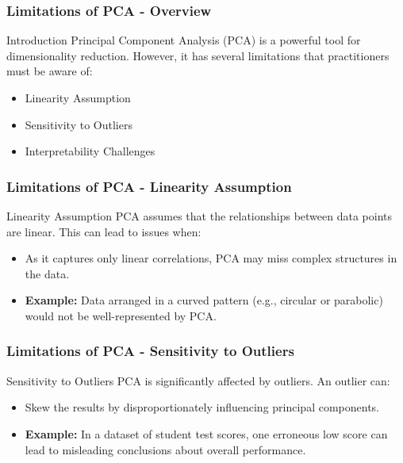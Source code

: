 \documentclass[aspectratio=169]{beamer}
\begin{document}
\begin{frame}[fragile]
    \frametitle{Limitations of PCA - Overview}
    \begin{block}{Introduction}
        Principal Component Analysis (PCA) is a powerful tool for dimensionality reduction. However, it has several limitations that practitioners must be aware of:
    \end{block}
    \begin{itemize}
        \item Linearity Assumption
        \item Sensitivity to Outliers
        \item Interpretability Challenges
    \end{itemize}
\end{frame}

\begin{frame}[fragile]
    \frametitle{Limitations of PCA - Linearity Assumption}
    \begin{block}{Linearity Assumption}
        PCA assumes that the relationships between data points are linear. This can lead to issues when:
    \end{block}
    \begin{itemize}
        \item As it captures only linear correlations, PCA may miss complex structures in the data.
        \item \textbf{Example:} Data arranged in a curved pattern (e.g., circular or parabolic) would not be well-represented by PCA.
    \end{itemize}
\end{frame}

\begin{frame}[fragile]
    \frametitle{Limitations of PCA - Sensitivity to Outliers}
    \begin{block}{Sensitivity to Outliers}
        PCA is significantly affected by outliers. An outlier can:
    \end{block}
    \begin{itemize}
        \item Skew the results by disproportionately influencing principal components.
        \item \textbf{Example:} In a dataset of student test scores, one erroneous low score can lead to misleading conclusions about overall performance.
    \end{itemize}
\end{frame}
\end{document}
